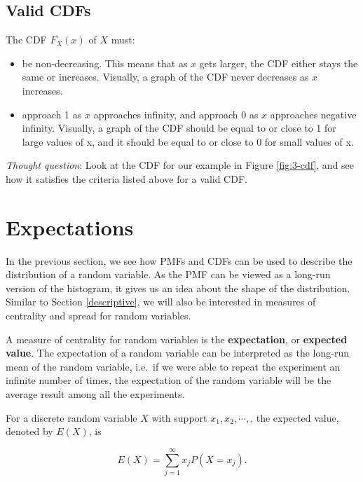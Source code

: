 \documentclass[
]{book}
\providecommand{\tightlist}{%
  \setlength{\itemsep}{0pt}\setlength{\parskip}{0pt}}
\begin{document}
\hypertarget{valid-cdfs}{%
\subsection{Valid CDFs}\label{valid-cdfs}}

The CDF \(F_X(x)\) of \(X\) must:

\begin{itemize}
\tightlist
\item
  be non-decreasing. This means that as \(x\) gets larger, the CDF either stays the same or increases. Visually, a graph of the CDF never decreases as \(x\) increases.
\item
  approach 1 as \(x\) approaches infinity, and approach 0 as \(x\) approaches negative infinity. Visually, a graph of the CDF should be equal to or close to 1 for large values of x, and it should be equal to or close to 0 for small values of x.
\end{itemize}

\emph{Thought question}: Look at the CDF for our example in Figure \ref{fig:3-cdf}, and see how it satisfies the criteria listed above for a valid CDF.

\hypertarget{expectations}{%
\section{Expectations}\label{expectations}}

In the previous section, we see how PMFs and CDFs can be used to describe the distribution of a random variable. As the PMF can be viewed as a long-run version of the histogram, it gives us an idea about the shape of the distribution. Similar to Section \ref{descriptive}, we will also be interested in measures of centrality and spread for random variables.

A measure of centrality for random variables is the \textbf{expectation}, or \textbf{expected value}. The expectation of a random variable can be interpreted as the long-run mean of the random variable, i.e.~if we were able to repeat the experiment an infinite number of times, the expectation of the random variable will be the average result among all the experiments.

For a discrete random variable \(X\) with support \(x_1, x_2, \cdots,\), the expected value, denoted by \(E(X)\), is

\begin{equation} 
E(X) = \sum_{j=1}^{\infty} x_j P(X=x_j).
\label{eq:3-EX}
\end{equation}
\end{document}
